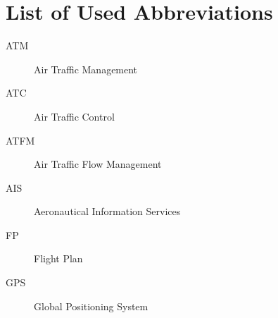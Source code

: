 \chapter{List of Used Abbreviations}

\begin{description}
\item[ATM] Air Traffic Management
\item[ATC] Air Traffic Control
\item[ATFM] Air Traffic Flow Management
\item[AIS] Aeronautical Information Services
\item[FP] Flight Plan
\item[GPS] Global Positioning System
\end{description}